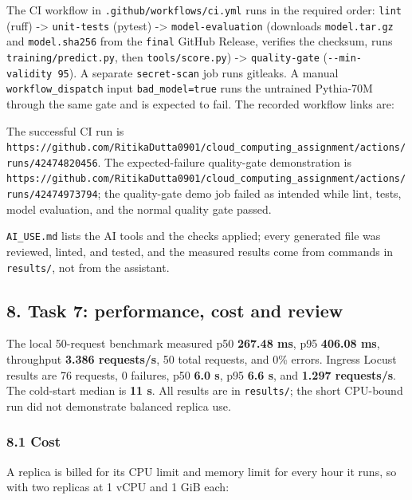 \documentclass[
]{article}
\begin{document}
The CI workflow in \texttt{.github/workflows/ci.yml} runs in the
required order: \texttt{lint} (ruff) -\textgreater{} \texttt{unit-tests}
(pytest) -\textgreater{} \texttt{model-evaluation} (downloads
\texttt{model.tar.gz} and \texttt{model.sha256} from the \texttt{final}
GitHub Release, verifies the checksum, runs
\texttt{training/predict.py}, then \texttt{tools/score.py})
-\textgreater{} \texttt{quality-gate} (\texttt{-\/-min-validity\ 95}). A
separate \texttt{secret-scan} job runs gitleaks. A manual
\texttt{workflow\_dispatch} input \texttt{bad\_model=true} runs the
untrained Pythia-70M through the same gate and is expected to fail. The
recorded workflow links are:

The successful CI run is
\texttt{https://github.com/RitikaDutta0901/cloud\_computing\_assignment/actions/runs/42474820456}.
The expected-failure quality-gate demonstration is
\texttt{https://github.com/RitikaDutta0901/cloud\_computing\_assignment/actions/runs/42474973794};
the quality-gate demo job failed as intended while lint, tests, model
evaluation, and the normal quality gate passed.

\texttt{AI\_USE.md} lists the AI tools and the checks applied; every
generated file was reviewed, linted, and tested, and the measured
results come from commands in \texttt{results/}, not from the assistant.

\hypertarget{task-7-performance-cost-and-review}{%
\subsection{8. Task 7: performance, cost and
review}\label{task-7-performance-cost-and-review}}

The local 50-request benchmark measured p50 \textbf{267.48 ms}, p95
\textbf{406.08 ms}, throughput \textbf{3.386 requests/s}, 50 total
requests, and 0\% errors. Ingress Locust results are 76 requests, 0
failures, p50 \textbf{6.0 s}, p95 \textbf{6.6 s}, and \textbf{1.297
requests/s}. The cold-start median is \textbf{11 s}. All results are in
\texttt{results/}; the short CPU-bound run did not demonstrate balanced
replica use.

\hypertarget{cost}{%
\subsubsection{8.1 Cost}\label{cost}}

A replica is billed for its CPU limit and memory limit for every hour it
runs, so with two replicas at 1 vCPU and 1 GiB each:
\end{document}
